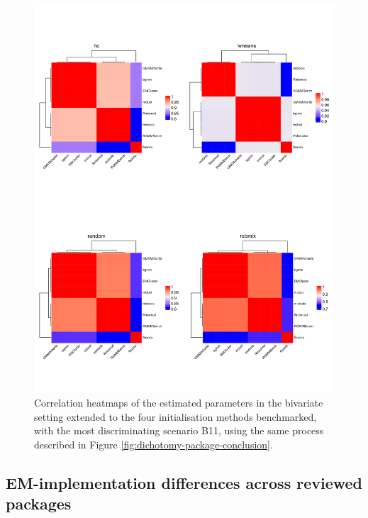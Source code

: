 \begin{figure}

{\centering \includegraphics[width=1\linewidth]{./figs/multivariate/heatmap_multivariate} 

}

\caption{Correlation heatmaps of the estimated parameters in the bivariate setting extended to the four initialisation methods benchmarked, with the most discriminating scenario B11, using the same process described in Figure \ref{fig:dichotomy-package-conclusion}.}\label{fig:heatmap-all-correlation-plots-multivariate}
\end{figure}

\hypertarget{em-implementation-differences-across-reviewed-packages}{%
\subsection{EM-implementation differences across reviewed packages}\label{em-implementation-differences-across-reviewed-packages}}

